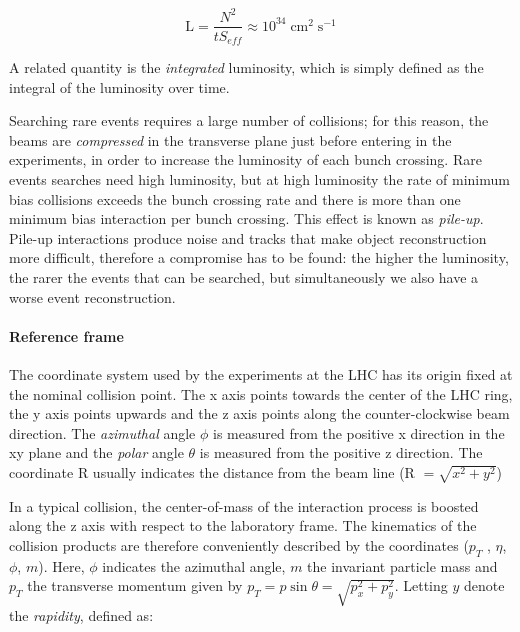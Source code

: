 \[ \text{L} = \frac{N^2}{tS_{eff}} \approx 10^{34} \; \text{cm}^2 \;\text{s}^{-1}
\]

A related quantity is the \emph{integrated} luminosity, which is simply defined as the integral of the luminosity over time.

Searching rare events requires a large number of collisions; for this reason, the
beams are \emph{compressed} in the transverse plane just before entering in the experiments, in order to increase the luminosity of each bunch crossing. Rare events searches need high luminosity, but at high luminosity the rate
of minimum bias collisions exceeds the
bunch crossing rate and there is more
than one minimum bias interaction per
bunch crossing. This effect is known
as \emph{pile-up}. Pile-up interactions produce noise and tracks that make object
reconstruction more difficult, therefore
a compromise has to be found: the higher
the luminosity, the rarer the events that can
be searched, but simultaneously we also have a worse event reconstruction.

\paragraph{Reference frame}


The coordinate system used by the experiments at the LHC has its origin fixed at the nominal collision point. The x axis points towards the center of the LHC ring, the y axis points
upwards and the z axis points along the counter-clockwise beam direction. The \emph{azimuthal}
angle $\phi$ is measured from the positive x direction in the xy plane and the \emph{polar} angle $\theta$ is
measured from the positive z direction. The coordinate R usually indicates the distance from
the beam line (R $= \sqrt{x^2 + y^2}$)

In a typical collision, the center-of-mass of the interaction process is boosted along the
z axis with respect to the laboratory frame. The kinematics of the collision products are
therefore conveniently described by the coordinates ($p_T$ , $\eta$, $\phi$, $m$). Here, $\phi$ indicates the
azimuthal angle, $m$ the invariant particle mass and $p_T$ the transverse momentum given by $p_T =
p\sin\theta = \sqrt{p_x^2 + p_y^2}$. Letting $y$ denote the \emph{rapidity}, defined as:

